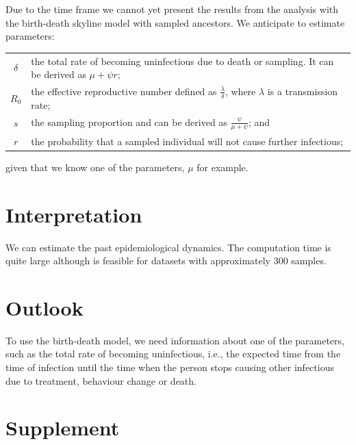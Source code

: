 \documentclass[12pt]{article}
\begin{document}
Due to the time frame we cannot yet present the results from the analysis with the birth-death skyline model with sampled ancestors. We anticipate to estimate parameters: 
\vskip2mm

\begin{tabular} {cp{}}
$\delta$ & the total rate of becoming uninfectious due to death or sampling. It can be derived as  $\mu + \psi r$; \\

$R_0$ & the effective reproductive number defined as $\frac \lambda \delta$, where $\lambda$ is a transmission rate;  \\

$s$ & the sampling proportion and can be derived as $\frac \psi {\mu + \psi}$;  and\\

$r$ & the probability that a sampled individual will not cause further infectious;
\end{tabular}

\vskip2mm

\noindent given that we know one of the parameters, $\mu$ for example.  

\section{Interpretation}

We can estimate the past epidemiological dynamics. The computation time is quite large although is feasible for datasets with approximately 300 samples. 



\section{Outlook}

To use the birth-death model, we need information about one of the parameters, such as the total rate of becoming uninfectious, i.e., the expected time from the time of infection until the time when the person stops causing other infectious due to treatment, behaviour change or death. 

\section{Supplement}
\end{document}
